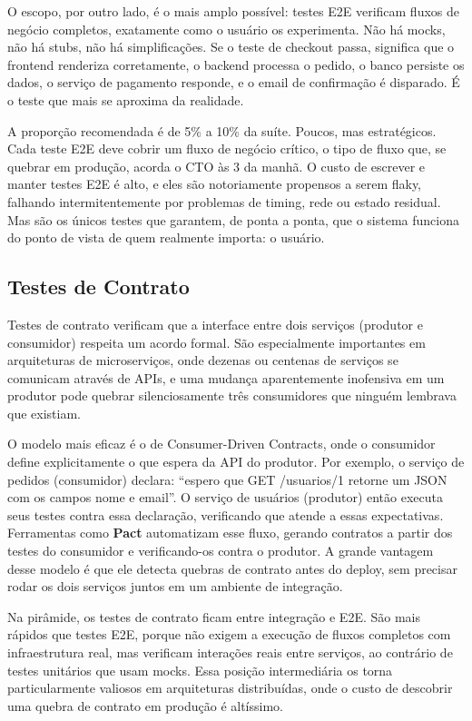O escopo, por outro lado, é o mais amplo possível: testes E2E verificam fluxos
de negócio completos, exatamente como o usuário os experimenta. Não há mocks,
não há stubs, não há simplificações. Se o teste de checkout passa, significa que
o frontend renderiza corretamente, o backend processa o pedido, o banco persiste
os dados, o serviço de pagamento responde, e o email de confirmação é disparado.
É o teste que mais se aproxima da realidade.

A proporção recomendada é de 5\% a 10\% da suíte. Poucos, mas estratégicos.
Cada teste E2E deve cobrir um fluxo de negócio crítico, o tipo de fluxo que,
se quebrar em produção, acorda o CTO às 3 da manhã. O custo de escrever e
manter testes E2E é alto, e eles são notoriamente propensos a serem flaky,
falhando intermitentemente por problemas de timing, rede ou estado residual.
Mas são os únicos testes que garantem, de ponta a ponta, que o sistema funciona
do ponto de vista de quem realmente importa: o usuário.

\subsection{Testes de Contrato}

Testes de contrato verificam que a interface entre dois serviços (produtor e
consumidor) respeita um acordo formal. São especialmente importantes em
arquiteturas de microserviços, onde dezenas ou centenas de serviços se comunicam
através de APIs, e uma mudança aparentemente inofensiva em um produtor pode
quebrar silenciosamente três consumidores que ninguém lembrava que existiam.

O modelo mais eficaz é o de Consumer-Driven Contracts, onde o consumidor define
explicitamente o que espera da API do produtor. Por exemplo, o serviço de
pedidos (consumidor) declara: ``espero que GET /usuarios/1 retorne um JSON com
os campos nome e email''. O serviço de usuários (produtor) então executa seus
testes contra essa declaração, verificando que atende a essas
expectativas. Ferramentas como \textbf{Pact} automatizam esse fluxo, gerando
contratos a partir dos testes do consumidor e verificando-os contra o produtor.
A grande vantagem desse modelo é que ele detecta quebras de contrato antes do
deploy, sem precisar rodar os dois serviços juntos em um ambiente de integração.

Na pirâmide, os testes de contrato ficam entre integração e E2E. São mais
rápidos que testes E2E, porque não exigem a execução de fluxos completos com
infraestrutura real, mas verificam interações reais entre serviços, ao
contrário de testes unitários que usam mocks. Essa posição intermediária os
torna particularmente valiosos em arquiteturas distribuídas, onde o custo de
descobrir uma quebra de contrato em produção é altíssimo.

